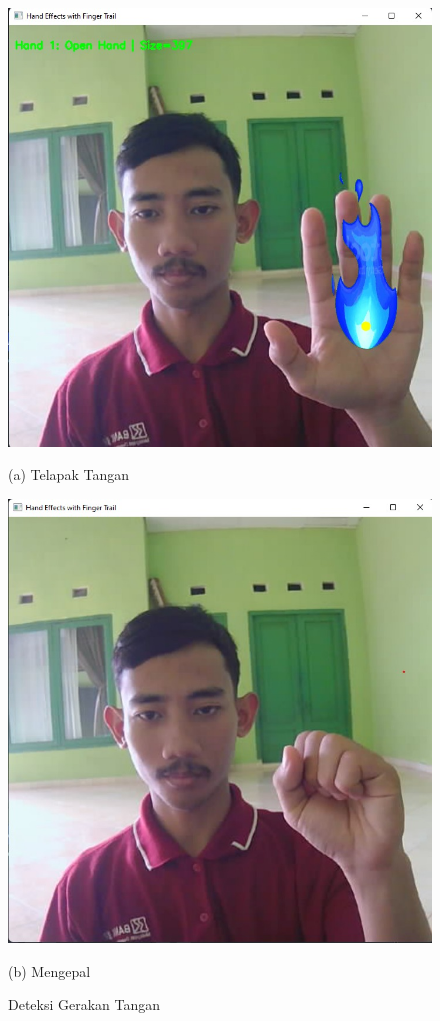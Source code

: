 \documentclass[11pt,a4paper]{article}
\begin{document}
    \begin{figure}[H]
        \centering
        \begin{minipage}[b]{0.45\textwidth}
            \centering
            \includegraphics[width=\textwidth]{Figure/telapak.jpg}
            \caption*{(a) Telapak Tangan}
        \end{minipage}
        \hfill
        \begin{minipage}[b]{0.45\textwidth}
            \centering
            \includegraphics[width=\textwidth]{Figure/mengepal.jpg}
            \caption*{(b) Mengepal}
        \end{minipage}
        \caption{Deteksi Gerakan Tangan}
        \label{fig:telapak_mengepal}
    \end{figure}
\end{document}

